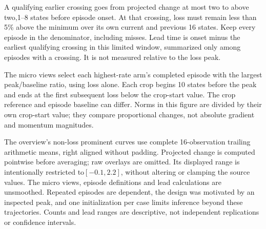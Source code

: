 A qualifying earlier crossing goes from projected change at most two to above
two,1--8 states before episode onset. At that crossing, loss must remain less
than 5\% above the minimum over its own current and previous 16 states. Keep
every episode in the denominator, including misses. Lead time is onset minus
the earliest qualifying crossing in this limited window, summarized only
among episodes with a crossing. It is not measured relative to the loss peak.

The micro views select each highest-rate arm's completed episode with the
largest peak/baseline ratio, using loss alone. Each crop begins 10 states before
the peak and ends at the first subsequent loss below the crop-start value.
The crop reference and episode baseline can differ. Norms in this figure are
divided by their own crop-start value; they compare proportional changes,
not absolute gradient and momentum magnitudes.

The overview's non-loss prominent curves use complete 16-observation trailing
arithmetic means, right aligned without padding. Projected change is computed
pointwise before averaging; raw overlays are omitted. Its displayed
range is intentionally restricted to$[-0.1,2.2]$, without altering or clamping
the source values. The micro views, episode definitions and lead calculations
are unsmoothed. Repeated episodes are dependent, the design was motivated by
an inspected peak, and one initialization per case limits inference beyond
these trajectories. Counts and lead ranges are descriptive, not independent
replications or confidence intervals.
